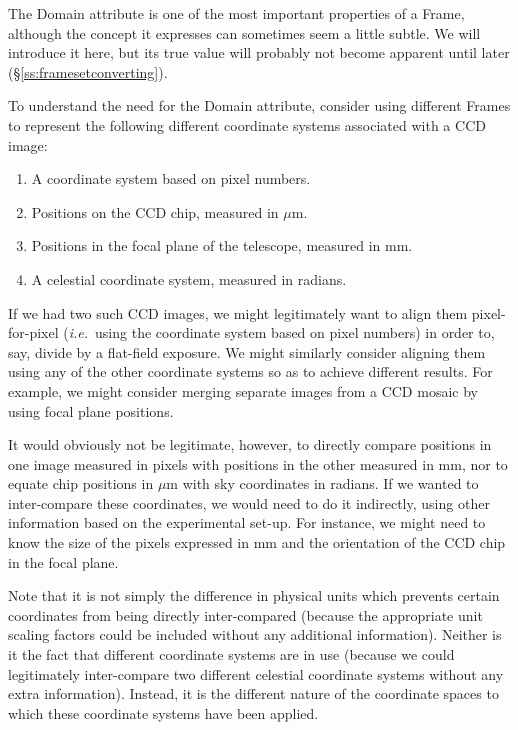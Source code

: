 \documentclass[twoside,11pt]{starlink}
\providecommand{\secref}[1]{\S\ref{#1}}
\begin{document}
The Domain attribute is one of the most important properties of a
Frame, although the concept it expresses can sometimes seem a little
subtle.  We will introduce it here, but its true value will probably
not become apparent until later (\secref{ss:framesetconverting}).

To understand the need for the Domain attribute, consider using
different Frames to represent the following different coordinate
systems associated with a CCD image:

\begin{enumerate}
\item A coordinate system based on pixel numbers.

\item Positions on the CCD chip, measured in $\mu$m.

\item Positions in the focal plane of the telescope, measured in mm.

\item A celestial coordinate system, measured in radians.
\end{enumerate}

If we had two such CCD images, we might legitimately want to align
them pixel-for-pixel (\emph{i.e.}\ using the coordinate system based
on pixel numbers) in order to, say, divide by a flat-field exposure.
We might similarly consider aligning them using any of the other
coordinate systems so as to achieve different results. For example, we
might consider merging separate images from a CCD mosaic by using
focal plane positions.

It would obviously not be legitimate, however, to directly compare
positions in one image measured in pixels with positions in the other
measured in mm, nor to equate chip positions in $\mu$m with sky
coordinates in radians. If we wanted to inter-compare these
coordinates, we would need to do it indirectly, using other
information based on the experimental set-up. For instance, we might
need to know the size of the pixels expressed in mm and the
orientation of the CCD chip in the focal plane.

Note that it is not simply the difference in physical units which
prevents certain coordinates from being directly inter-compared
(because the appropriate unit scaling factors could be included
without any additional information). Neither is it the fact that
different coordinate systems are in use (because we could legitimately
inter-compare two different celestial coordinate systems without any
extra information).  Instead, it is the different nature of the
coordinate spaces to which these coordinate systems have been applied.
\end{document}
